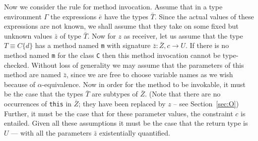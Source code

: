 \documentclass[preprint,nocopyrightspace,9pt]{sigplanconf}
\begin{document}
Now we consider the rule for method invocation. Assume that in a type
environment $\Gamma$ the expressions $\bar{e}$ have the types
$\bar{T}$. Since the actual values of these expressions are not known,
we shall assume that they take on some fixed but unknown values
$\bar{z}$ of type $\bar{T}$.  Now for $z$ as receiver, let us assume
that the type $T\equiv C\{d\}$ has a method named {\tt m} with
signature $\bar{z}: \bar{Z}, c \rightarrow U$.  If there is no method
named {\tt m} for the class {\tt C} then this method invocation cannot
be type-checked. Without loss of generality we may assume that the
parameters of this method are named $\bar{z}$, since we are free to
choose variable names as we wish because of $\alpha$-equivalence. Now
in order for the method to be invokable, it must be the case that the
types $\bar{T}$ are subtypes of $\bar{Z}$. (Note that there are no
occurrences of {\tt this} in $\bar{Z}$; they have been replaced by
$z$ -- see Section~\ref{sec:O}) Further, it must be the case that for these parameter values,
the constraint $c$ is entailed. Given all these assumptions it must be
the case that the return type is $U$ --- with all the parameters
$\bar{z}$ existentially quantified.
\end{document}
